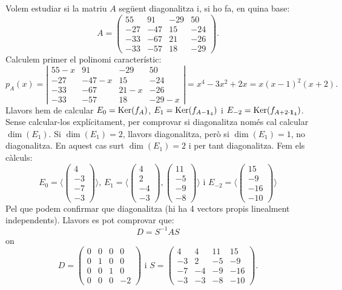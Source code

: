 \begin{exemple}
Volem estudiar si la matriu $A$ següent diagonalitza i, si ho fa, en quina base:
$$
A=\left(\begin{array}{rrrr}
55 & 91 & -29 & 50 \\
-27 & -47 & 15 & -24 \\
-33 & -67 & 21 & -26 \\
-33 & -57 & 18 & -29
\end{array}\right).
$$
Calculem primer el polinomi característic:
$$
p_A(x)=\left|\begin{array}{cccc}
55-x & 91 & -29 & 50 \\
-27 & -47-x & 15 & -24 \\
-33 & -67 & 21-x & -26 \\
-33 & -57 & 18 & -29-x
\end{array}\right|=x^4-3x^2+2x=x(x-1)^2(x+2).
$$
Llavors hem de calcular $E_0=\operatorname{Ker}(f_A)$, $E_1=\operatorname{Ker}(f_{A-\mathbf{1}_4})$ i $E_{-2}=\operatorname{Ker}(f_{A+2\cdot\mathbf{1}_4})$. Sense calcular-los explícitament, per comprovar si diagonalitza només cal calcular $\dim(E_1)$. Si $\dim(E_1)=2$, llavors diagonalitza, però si $\dim(E_1)=1$, no diagonalitza. En aquest cas surt $\dim(E_1)=2$ i per tant diagonalitza. Fem els càlculs:
$$
E_0=\langle\begin{pmatrix}4\\-3\\-7\\-3\end{pmatrix}\rangle \text{, }
E_1=\langle\begin{pmatrix}4\\2\\-4\\-3\end{pmatrix},\begin{pmatrix}11\\-5\\-9\\-8\end{pmatrix}\rangle \text{ i }
E_{-2}=\langle\begin{pmatrix}15\\-9\\-16\\-10\end{pmatrix}\rangle
$$
Pel que podem confirmar que diagonalitza (hi ha 4 vectors propis linealment independents).
Llavors es pot comprovar que:
$$D=S^{-1}AS$$ on
$$
D=\left(\begin{array}{rrrr}
0 & 0 & 0 & 0 \\
0 & 1 & 0 & 0 \\
0 & 0 & 1 & 0 \\
0 & 0 & 0 & -2
\end{array}\right)
\text{ i }
S=\left(\begin{array}{rrrr}
4 & 4 & 11 & 15  \\
-3 & 2 & -5 & -9   \\
-7 & -4 & -9 & -16  \\
-3 & -3 & -8 & -10 
\end{array}\right).
$$
\end{exemple}
